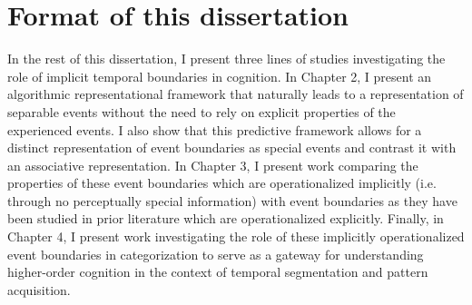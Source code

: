 \section{Format of this dissertation}\label{format-of-this-dissertation}

In the rest of this dissertation, I present three lines of studies investigating the role of implicit temporal boundaries in cognition. In Chapter 2, I present an algorithmic representational framework that naturally leads to a representation of separable events without the need to rely on explicit properties of the experienced events. I also show that this predictive framework allows for a distinct representation of event boundaries as special events and contrast it with an associative representation. In Chapter 3, I present work comparing the properties of these event boundaries which are operationalized implicitly (i.e. through no perceptually special information) with event boundaries as they have been studied in prior literature which are operationalized explicitly. Finally, in Chapter 4, I present work investigating the role of these implicitly operationalized event boundaries in categorization to serve as a gateway for understanding higher-order cognition in the context of temporal segmentation and pattern acquisition.
